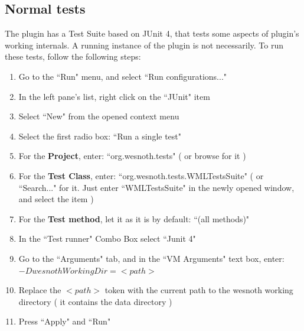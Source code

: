 \documentclass[10pt]{article}
\begin{document}
\subsection{Normal tests}
The plugin has a Test Suite based on JUnit 4, that tests some aspects of plugin's working internals. A running instance of the plugin is not necessarily. To run these tests, follow the following steps:
\begin{enumerate}
	\item Go to the ``Run" menu, and select ``Run configurations..."
	\item In the left pane's list, right click on the ``JUnit" item
	\item Select ``New" from the opened context menu
	\item Select the first radio box: ``Run a single test"
	\item For the \textbf{Project}, enter: ``org.wesnoth.tests" ( or browse for it )
	\item For the \textbf{Test Class}, enter: ``org.wesnoth.tests.WMLTestsSuite" ( or ``Search..." for it. Just enter ``WMLTestsSuite" in the newly opened window, and select the item )
	\item For the \textbf{Test method}, let it as it is by default: ``(all methods)"
	\item In the ``Test runner" Combo Box select ``Junit 4"
	\item Go to the ``Arguments" tab, and in the ``VM Arguments" text box, enter: $-DwesnothWorkingDir=<path>$
	\item Replace the $<path>$ token with the current path to the wesnoth working directory ( it contains the data directory )
	\item Press ``Apply" and ``Run"
\end{enumerate}
\end{document}

